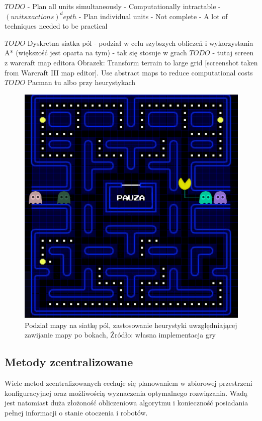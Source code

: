 $TODO$
- Plan all units simultaneously
	- Computationally intractable
	- $(units x actions)^depth$
- Plan individual units
	- Not complete
	- A lot of techniques needed to be practical

$TODO$
Dyskretna siatka pól - podział w celu szybszych obliczeń i wykorzystania A* (większość jest oparta na tym) - tak się stosuje w grach
$TODO$ - tutaj screen z warcraft map editora
Obrazek: Transform terrain to large grid [screenshot taken from Warcraft III map editor]. \cite{hierpathfindinginrts}
Use abstract maps to reduce computational costs
$TODO$ Pacman tu albo przy heurystykach
\begin{figure}[H]
	\centering
	\includegraphics[width=13cm]{img/paclan1}
	\caption{Podział mapy na siatkę pól, zastosowanie heurystyki uwzględniającej zawijanie mapy po bokach, Źródło: własna implementacja gry}
	\label{fig:image_paclan1}
\end{figure}

\subsection{Metody zcentralizowane}
Wiele metod zcentralizowanych cechuje się planowaniem w zbiorowej przestrzeni konfiguracyjnej oraz możliwością wyznaczenia optymalnego rozwiązania.
Wadą jest natomiast duża złożoność obliczeniowa algorytmu i konieczność posiadania pełnej informacji o stanie otoczenia i robotów.

